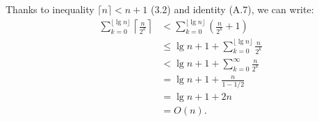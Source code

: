 \exercise
Thanks to inequality $\lceil n\rceil < n+1$ (3.2) and identity (A.7), we can write:
\begin{align*}
	\sum_{k=0}^{\lfloor\lg n\rfloor} \left\lceil\frac{n}{2^k}\right\rceil &< \sum_{k=0}^{\lfloor\lg n\rfloor} \left(\frac{n}{2^k}+1\right) \\
    &\le \lg n+1+\sum_{k=0}^{\lfloor\lg n\rfloor}\frac{n}{2^k} \\
    &< \lg n+1+\sum_{k=0}^\infty\frac{n}{2^k} \\
	&= \lg n+1+\frac{n}{1-1/2} \\
    &= \lg n+1+2n \\
    &= O(n).
\end{align*}
